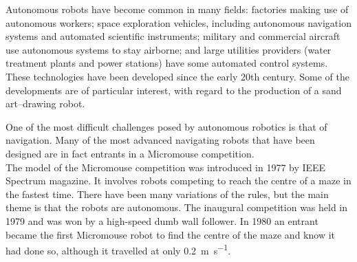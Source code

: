 \label{history of robotics}
    Autonomous robots have become common in many fields: factories making use of autonomous workers; space exploration vehicles, including autonomous navigation systems and automated scientific instruments; military and commercial aircraft use autonomous systems to stay airborne; and large utilities providers (\eg water treatment plants and power stations) have some automated control systems.\\
    These technologies have been developed since the early 20th century. Some of the developments are of particular interest, with regard to the production of a sand art--drawing robot.

    One of the most difficult challenges posed by autonomous robotics is that of navigation. Many of the most advanced navigating robots that have been designed are in fact entrants in a Micromouse competition.\\
    The model of the Micromouse competition was introduced in 1977 by IEEE Spectrum magazine.\cite{harrison2010} It involves robots competing to reach the centre of a maze in the fastest time. There have been many variations of the rules, but the main theme is that the robots are autonomous. The inaugural competition was held in 1979 and was won by a high-speed dumb wall follower. In 1980 an entrant became the first Micromouse robot to find the centre of the maze and know it had done so, although it travelled at only \SI{0.2}{\meter\per\second}.

